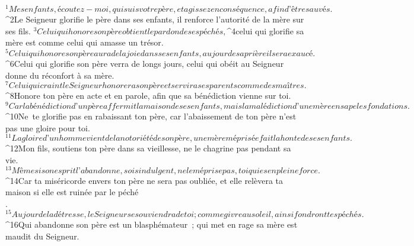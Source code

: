            
      
         
      \bchapter{}
${}^{1}Mes enfants, écoutez-moi, qui suis votre père,
        et agissez en conséquence, afin d’être sauvés.
        ${}^{2}Le Seigneur glorifie le père dans ses enfants,
        il renforce l’autorité de la mère sur ses fils.
        ${}^{3}Celui qui honore son père
        obtient le pardon de ses péchés,
        ${}^{4}celui qui glorifie sa mère
        est comme celui qui amasse un trésor.
        ${}^{5}Celui qui honore son père aura de la joie dans ses enfants,
        au jour de sa prière il sera exaucé.
        ${}^{6}Celui qui glorifie son père verra de longs jours,
        celui qui obéit au Seigneur donne du réconfort à sa mère.
${}^{7}Celui qui craint le Seigneur honorera son père
        et servira ses parents comme des maîtres.
${}^{8}Honore ton père en acte et en parole,
        afin que sa bénédiction vienne sur toi.
${}^{9}Car la bénédiction d’un père affermit la maison de ses enfants,
        mais la malédiction d’une mère en sape les fondations.
${}^{10}Ne te glorifie pas en rabaissant ton père,
        car l’abaissement de ton père n’est pas une gloire pour toi.
${}^{11}La gloire d’un homme vient de la notoriété de son père,
        une mère méprisée fait la honte de ses enfants.
        ${}^{12}Mon fils, soutiens ton père dans sa vieillesse,
        ne le chagrine pas pendant sa vie.
        ${}^{13}Même si son esprit l’abandonne, sois indulgent,
        ne le méprise pas, toi qui es en pleine force.
        ${}^{14}Car ta miséricorde envers ton père ne sera pas oubliée,
        et elle relèvera ta maison si elle est ruinée par le péché\\.
${}^{15}Au jour de la détresse, le Seigneur se souviendra de toi ;
        comme givre au soleil, ainsi fondront tes péchés.
${}^{16}Qui abandonne son père est un blasphémateur ;
        qui met en rage sa mère est maudit du Seigneur.
        
